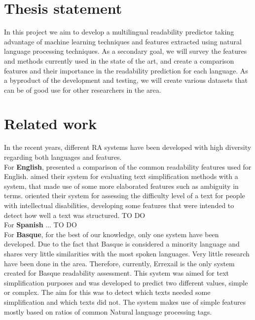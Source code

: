 \documentclass[12pt]{article}
\begin{document}
\section{Thesis statement}
 In this project we aim to develop a multilingual readability predictor taking advantage of machine learning techniques and features extracted using natural language processing techniques. As a secondary goal, we will survey the features and methods currently used in the state of the art, and create a comparison features and their importance in the readability prediction for each language. As a byproduct of the development and testing, we will create various datasets that can be of good use for other researchers in the area.


\section{Related work}
In the recent years, different RA systems have been developed with high diversity regarding both languages and features. \\

For \textbf{English}, \cite{feng2010comparison} presented a comparison of the common readability features used for English. \cite{aluisio2010readability} aimed their system for evaluating text simplification methods with a system, that made use of some more elaborated features such as ambiguity in terms. \cite{feng2009automatic} oriented their system for assessing the difficulty level of a text for people with intellectual disabilities, developing some features that were intended to detect how well a text was structured.{\color{red} TO DO} \\  

For \textbf{Spanish} \cite{vstajner2013readability} \cite{drndarevic2013automatic} ... {\color{red} TO DO} \\


For \textbf{Basque}, for the best of our knowledge, only one system have been developed. Due to the fact that Basque is considered a minority language and shares very little similarities with the most spoken languages. Very little research have been done in the area. Therefore, currently, Errexail \cite{gonzalez2014simple} is the only system created for Basque readability assessment. This system was aimed for text simplification purposes and was developed to predict two different values, simple or complex. The aim for this was to detect which texts needed some simplification and which texts did not. The system makes use of simple features mostly based on ratios of common Natural language processing tags.\\
\end{document}
